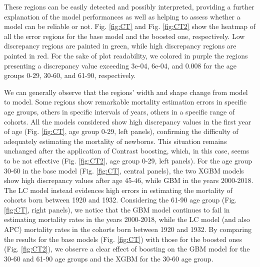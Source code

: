 \documentclass[fleqn,10pt]{wlscirep}
\begin{document}
These regions can be easily detected and possibly interpreted, providing a further explanation of the model performances as well as helping to assess whether a model can be reliable or not. Fig. \ref{fig:CT} and Fig. \ref{fig:CT2} show the heatmap of all the error regions for the base model and the boosted one, respectively. \color{black} Low discrepancy regions are painted in green, while high discrepancy regions are painted in red. 
For the sake of plot readability, we colored in purple the regions presenting a discrepancy value exceeding 3e-04, 6e-04, and 0.008 for the age groups 0-29, 30-60, and 61-90, respectively.

\color{blue} We can generally observe that the regions’ width and shape change from model to model. Some regions show remarkable mortality estimation errors in specific age groups, others in specific intervals of years, others in a specific range of cohorts. 
All the models considered show high discrepancy values in the first year of age (Fig. \ref{fig:CT}, age group 0-29, left panels), confirming the difficulty of adequately estimating the mortality of newborns. This situation remains unchanged after the application of Contrast boosting, which, in this case, seems to be not effective (Fig. \ref{fig:CT2}, age group 0-29, left panels).
For the age group 30-60 in the base model (Fig. \ref{fig:CT}, central panels), the two XGBM models show high discrepancy values after age 45-46, while GBM in the years 2000-2018. The LC model instead evidences high errors in estimating the mortality of cohorts born between 1920 and 1932. Considering the 61-90 age group (Fig. \ref{fig:CT}, right panels), we notice that the GBM model continues to fail in estimating mortality rates in the years 2000-2018, while the LC model (and also APC) mortality rates in the cohorts born between 1920 and 1932.
By comparing the results for the base models (Fig. \ref{fig:CT}) with those for the boosted ones (Fig. \ref{fig:CT2}), we observe a clear effect of boosting on the GBM model for the 30-60 and 61-90 age groups and the XGBM for the 30-60 age group. \color{black} 
\end{document}
